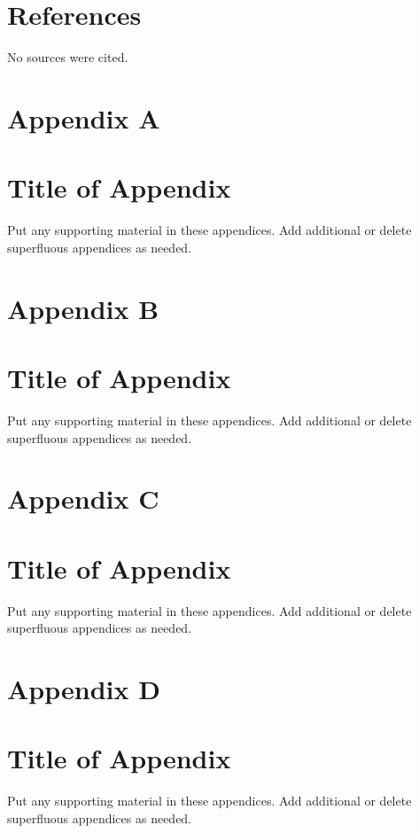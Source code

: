 \hypertarget{references}{%
\section{References}\label{references}}

No sources were cited.

\hypertarget{appendix-a}{%
\section{Appendix A}\label{appendix-a}}

\hypertarget{title-of-appendix}{%
\section{Title of Appendix}\label{title-of-appendix}}

Put any supporting material in these appendices. Add additional or
delete superfluous appendices as needed.

\hypertarget{appendix-b}{%
\section{Appendix B}\label{appendix-b}}

\hypertarget{title-of-appendix-1}{%
\section{Title of Appendix}\label{title-of-appendix-1}}

Put any supporting material in these appendices. Add additional or
delete superfluous appendices as needed.

\hypertarget{appendix-c}{%
\section{Appendix C}\label{appendix-c}}

\hypertarget{title-of-appendix-2}{%
\section{Title of Appendix}\label{title-of-appendix-2}}

Put any supporting material in these appendices. Add additional or
delete superfluous appendices as needed.

\hypertarget{appendix-d}{%
\section{Appendix D}\label{appendix-d}}

\hypertarget{title-of-appendix-3}{%
\section{Title of Appendix}\label{title-of-appendix-3}}

Put any supporting material in these appendices. Add additional or
delete superfluous appendices as needed.
